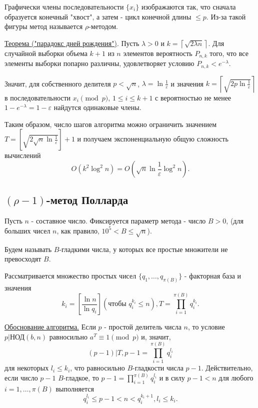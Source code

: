 \documentclass[bachelor, och, labwork]{shiza}
\begin{document}
        Графически члены последовательности $\{x_i\}$ изображаются так, что
        сначала образуется конечный "хвост", а затем - цикл конечной длины $\leq
        p$. Из-за такой фигуры метод называется $\rho$-методом.

        \underline{Теорема ("парадокс дней рождения")}. Пусть $\lambda > 0$ и $k
        = \left\lceil \sqrt{2\lambda n} \right\rceil$. Для случайной выборки
        объема $k + 1$ из $n$ элементов вероятность $P_{n,k}$ того, что все
        элементы выборки попарно различны, удовлетворяет условию $P_{n,k} <
        e^{-\lambda}$.

        Значит, для собственного делителя $p < \sqrt{n}$, $\lambda = \ln
        \frac{1}{\varepsilon}$ и значения $k = \left\lceil \sqrt{2p \ln
        \frac{1}{\varepsilon}} \right\rceil$ в последовательности $x_i \pmod p$,
        $1 \leq i \leq k + 1$ с вероятностью не менее $1 - e^{-\lambda} = 1 -
        \varepsilon$ найдутся одинаковые члены.

        Таким образом, число шагов алгоритма можно ограничить значением $T =
        \left[\sqrt{2\sqrt{n}\ln \frac{1}{\varepsilon}} \right] + 1$ и получаем
        экспоненциальную общую сложность вычислений $$O(k^2 \log^2 n) =
        O(\sqrt{n}\ln \frac{1}{\varepsilon} \log^2 n).$$

    \subsection{$(\rho - 1)$-метод Полларда}

        Пусть $n$ - составное число. Фиксируется параметр метода - число $B >
        0$, (для больших чисел $n$, как правило, $10^5 < B \leq \sqrt{n}$).

        Будем называть $B$-гладкими числа, у которых все простые множители не
        превосходят $B$.

        Рассматривается множество простых чисел $\{q_1, \dots, q_{\pi(B)}\}$ -
        факторная база и значения $$k_i = \left[\frac{\ln n}{\ln q_i}\right]
        (\text{чтобы } q_i^{k_i} \leq n), T = \prod_{i=1}^{\pi(B)} q_i^{k_i}.$$

        \underline{Обоснование алгоритма.} Если $p$ - простой делитель числа
        $n$, то условие $p | \text{НОД}(b,n)$ равносильно $a^T \equiv 1 \pmod p$
        и, значит, $$(p - 1) | T, p - 1 = \prod_{i=1}^{\pi(B)} q_i^{l_i}$$ для
        некоторых $l_i \leq k_i$, что равносильно $B$-гладкости числа $p - 1$.
        Действительно, если число $p - 1$ $B$-гладкое, то $p - 1 =
        \prod_{i=1}^{\pi(B)} q_i^{l_i}$ и в силу $p - 1 < n$ для любого $i = 1,
        \dots, \pi(B)$ выполняется $$q_i^{l_i} \leq p - 1 < n < q_i^{k_i + 1},
        l_i \leq k_i.$$
\end{document}

